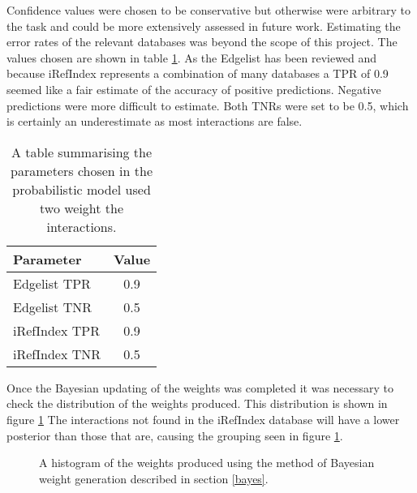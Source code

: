 Confidence values were chosen to be conservative but otherwise were arbitrary to the task and could be more extensively assessed in future work.
Estimating the error rates of the relevant databases was beyond the scope of this project.
The values chosen are shown in table \ref{tab:estimates}.
As the Edgelist has been reviewed and because iRefIndex represents a combination of many databases a \ac{TPR} of 0.9 seemed like a fair estimate of the accuracy of positive predictions.
Negative predictions were more difficult to estimate.
Both TNRs were set to be 0.5, which is certainly an underestimate as most interactions are false.

\begin{table}
    \centering
    \begin{tabular}{l c }
        Parameter       & Value \\
        \hline
        Edgelist \ac{TPR}    & 0.9 \\
        Edgelist TNR    & 0.5 \\
        iRefIndex \ac{TPR}   & 0.9 \\
        iRefIndex TNR   & 0.5 \\
    \end{tabular}
    \caption{A table summarising the parameters chosen in the probabilistic model used two weight the interactions.}
    \label{tab:estimates}
\end{table}

Once the Bayesian updating of the weights was completed it was necessary to check the distribution of the weights produced.
This distribution is shown in figure \ref{fig:weightdist}
The interactions not found in the iRefIndex database will have a lower posterior than those that are, causing the grouping seen in figure \ref{fig:weightdist}.

\begin{figure}
    \centering
    \setlength\figureheight{3in}
    \setlength\figurewidth{4in}
    \caption{A histogram of the weights produced using the method of Bayesian weight generation described in section \ref{bayes}.}
    \label{fig:weightdist}
\end{figure}

